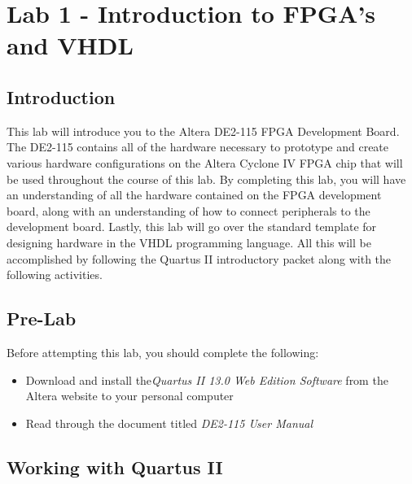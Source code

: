 \section{Lab 1 - Introduction to FPGA's and VHDL}

\subsection{Introduction}
This lab will introduce you to the Altera DE2-115 FPGA Development Board. The DE2-115 contains all of the hardware necessary to prototype and create various hardware configurations on the Altera Cyclone IV FPGA chip that will be used throughout the course of this lab. By completing this lab, you will have an understanding of all the hardware contained on the FPGA development board, along with an understanding of how to connect peripherals to the development board. Lastly, this lab will go over the standard template for designing hardware in the VHDL programming language. All this will be accomplished by following the Quartus II introductory packet along with the following activities.

\subsection{Pre-Lab}

Before attempting this lab, you should complete the following:
\begin{itemize}
\item Download and install the\emph{Quartus II 13.0 Web Edition Software} from the Altera website to your personal computer
\item Read through the document titled \emph{DE2-115 User Manual}
\end{itemize}
 
\subsection{Working with Quartus II}


